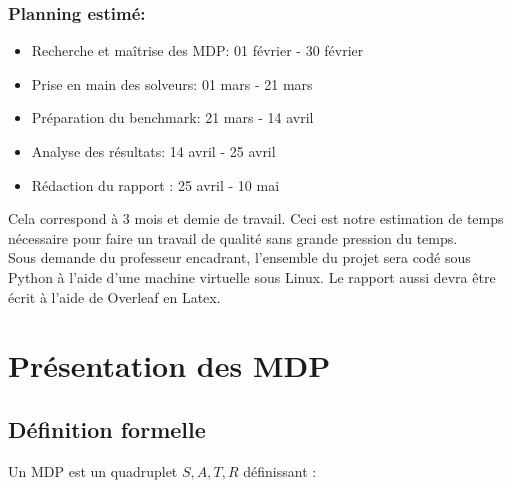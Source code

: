\documentclass{article}
\begin{document}
\subsubsection{Planning estimé:}

\begin{itemize}
    \item Recherche et maîtrise des MDP: 01 février - 30 février
    \item Prise en main des solveurs: 01 mars - 21 mars
    \item Préparation du benchmark: 21 mars - 14 avril
    \item Analyse des résultats: 14 avril - 25 avril
    \item Rédaction du rapport : 25 avril -  10 mai
\end{itemize}
Cela correspond à 3 mois et demie de travail. Ceci est notre estimation de temps nécessaire pour faire un travail de qualité sans grande pression du temps.\\
Sous demande du professeur encadrant, l’ensemble du projet sera codé sous Python à l’aide d’une machine virtuelle sous Linux. Le rapport aussi devra être écrit à l’aide de Overleaf en Latex.



\section{Présentation des MDP}

\subsection{Définition formelle}
\noindent Un MDP est un quadruplet $ {S, A,T, R}$ définissant :
\end{document}
